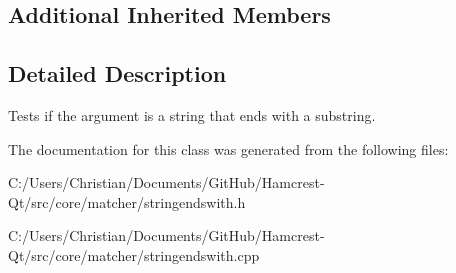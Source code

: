 \subsection*{Additional Inherited Members}


\subsection{Detailed Description}
Tests if the argument is a string that ends with a substring. 

The documentation for this class was generated from the following files\-:\begin{DoxyCompactItemize}
\item 
C\-:/\-Users/\-Christian/\-Documents/\-Git\-Hub/\-Hamcrest-\/\-Qt/src/core/matcher/stringendswith.\-h\item 
C\-:/\-Users/\-Christian/\-Documents/\-Git\-Hub/\-Hamcrest-\/\-Qt/src/core/matcher/stringendswith.\-cpp\end{DoxyCompactItemize}
